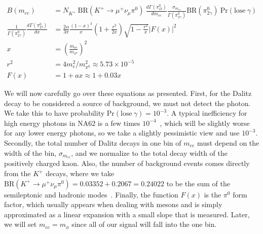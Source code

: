 \begin{align}
\label{eqn:kaon_dalitz_background}
B(m_{ee}) &= N_{K^+}~\textrm{BR}(K^+ \rightarrow \mu^+ \nu_\mu \pi^0)~\frac{d\Gamma(\pi^0_D)}{d m_{ee}} \frac{\sigma_{m_{ee}}}{\Gamma(\pi^0_{2\gamma})} \textrm{BR}(\pi^0_{2\gamma})~\textrm{Pr}(\textrm{lose}~\gamma) \\
\frac{1}{\Gamma(\pi^0_{2\gamma})} \frac{d\Gamma(\pi^0_D)}{dx} &= \frac{2\alpha}{3\pi} \frac{(1-x)^3}{x}(1+\frac{r^2}{2x})\sqrt{1-\frac{r^2}{x}}\left|F(x)\right|^2 \\
x &= \left(\frac{m_{ee}}{m_{\pi^0}}\right)^2 \\
r^2 &= 4 m_e^2 / m_{\pi^0}^2 \approx 5.73\times 10^{-5} \\
F(x) &= 1 + ax \approx 1+0.03x
\end{align}

We will now carefully go over these equations as presented.
First, for the Dalitz decay to be considered a source of background, we must not detect the photon.
We take this to have probability $\textrm{Pr}(\textrm{lose}~\gamma) = 10^{-3}$.
A typical inefficiency for high energy photons in NA62 is a few times $10^{-4}$~\cite{Martellotti:2015kna}, which will be slightly worse for any lower energy photons, so we take a slightly pessimistic view and use $10^{-3}$.
Secondly, the total number of Dalitz decays in one bin of $m_{ee}$ must depend on the width of the bin, $\sigma_{m_{ee}}$, and we normalize to the total decay width of the positively charged kaon.
Also, the number of background events comes directly from the $K^+$ decays, where we take $\textrm{BR}(K^+ \rightarrow \mu^+ \nu_\mu \pi^0) = 0.03352 + 0.2067 = 0.24022$ to be the sum of the semileptonic and hadronic modes~\cite{Agashe:2014kda}.
Finally, the function $F(x)$ is the $\pi^0$ form factor, which usually appears when dealing with mesons and is simply approximated as a linear expansion with a small slope that is measured.
Later, we will set $m_{ee} = m_\phi$ since all of our signal will fall into the one bin.

